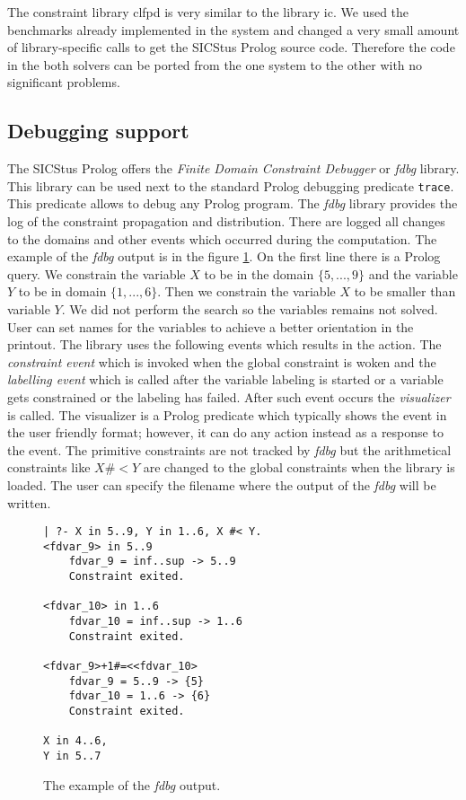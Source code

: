 The constraint library clfpd is very similar to the \eclipse library ic. We used the 
benchmarks already implemented in the \eclipse system and changed a very small amount
of library-specific calls to get the SICStus Prolog source code. Therefore the
code in the both solvers can be ported from the one system to the other with no 
significant problems.    

\subsection{Debugging support}
The SICStus Prolog offers the {\em Finite Domain Constraint Debugger} or {\em fdbg} library.
This library can be used next to the standard Prolog debugging predicate \texttt{trace}. This
predicate allows to debug any Prolog program. The {\em fdbg} library provides the
log of the constraint propagation and distribution. There are logged all changes to the
domains and other events which occurred during the computation. The example of the {\em fdbg}
output is in the figure \ref{sicstus:fdbg}. On the first line there is a Prolog query.
We constrain the variable $X$ to be in the domain $\{5,...,9\}$ and the variable $Y$
to be in domain $\{1,...,6\}$. Then we constrain the variable $X$ to be smaller than
variable $Y$. We did not perform the search so the variables remains not solved.
User can set names for the variables to achieve a better orientation in the printout.
The library uses the following events which results in the action. The {\em constraint 
event} which is invoked when the global constraint is woken and the {\em labelling event}
which is called after the variable labeling is started or a variable gets constrained
or the labeling has failed. After such event occurs the {\em visualizer} is called. 
The visualizer is a Prolog predicate which typically shows the event in the user 
friendly format; however, it can do any action instead as a response to the event.
The primitive constraints are not tracked by {\em fdbg} but the arithmetical constraints
like $X \#< Y$ are changed to the global constraints when the library is loaded.
The user can specify the filename where the output of the {\em fdbg} will be written.

\begin{figure}
\caption{\label{sicstus:fdbg}The example of the {\em fdbg} output.}
\begin{verbatim}
| ?- X in 5..9, Y in 1..6, X #< Y.
<fdvar_9> in 5..9
    fdvar_9 = inf..sup -> 5..9
    Constraint exited.

<fdvar_10> in 1..6
    fdvar_10 = inf..sup -> 1..6
    Constraint exited.

<fdvar_9>+1#=<<fdvar_10>
    fdvar_9 = 5..9 -> {5}
    fdvar_10 = 1..6 -> {6}
    Constraint exited.
    
X in 4..6,
Y in 5..7 
\end{verbatim}   
\end{figure}

